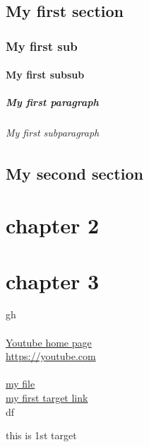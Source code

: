\documentclass[12pt]{article}
\begin{document}
\tableofcontents


\newpage



\section{My first section}
\subsection{My first sub}
\subsubsection{My first subsub}
\paragraph{My first paragraph}
\subparagraph{My first subparagraph}

\section{My second section}



\chapter*{chapter 2}
\chapter{chapter 3}






gh\\\\

\href{https://youtube.com}{Youtube home page}\\
\url{https://youtube.com}\\\\

\href{run:/home/Cyber_Wolf/Programs/latex/_libs/links.tex}{my file}\\



\hyperlink{target1}{my first target link}\\






\newpage
df
\newpage


\hypertarget{target1}{this is 1st target}\\

{}
\end{document}
